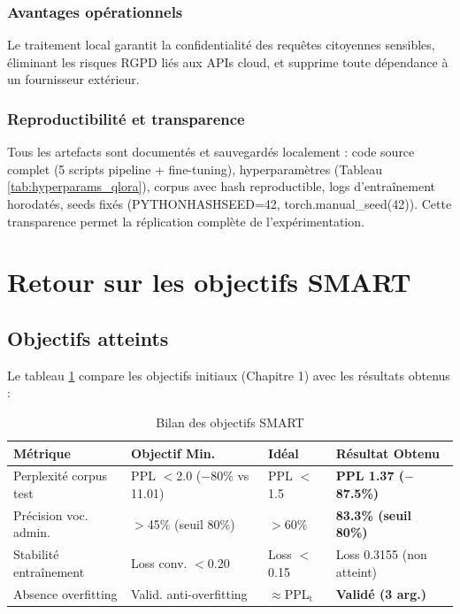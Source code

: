 \subsubsection{Avantages opérationnels}

Le traitement local garantit la confidentialité des requêtes citoyennes sensibles, éliminant les risques RGPD liés aux APIs cloud, et supprime toute dépendance à un fournisseur extérieur.

\subsubsection{Reproductibilité et transparence}

Tous les artefacts sont documentés et sauvegardés localement : code source complet (5 scripts pipeline + fine-tuning), hyperparamètres (Tableau \ref{tab:hyperparams_qlora}), corpus avec hash reproductible, logs d'entraînement horodatés, seeds fixés (PYTHONHASHSEED=42, torch.manual\_seed(42)). Cette transparence permet la réplication complète de l'expérimentation.

\section{Retour sur les objectifs SMART}

\subsection{Objectifs atteints}

Le tableau \ref{tab:smart_final} compare les objectifs initiaux (Chapitre 1) avec les résultats obtenus :

\begin{table}[h]
\centering
\small
\caption{Bilan des objectifs SMART}
\label{tab:smart_final}
\begin{tabular}{@{}p{3cm}p{3cm}p{1.8cm}p{3.2cm}@{}}
\toprule
\textbf{Métrique} & \textbf{Objectif Min.} & \textbf{Idéal} & \textbf{Résultat Obtenu} \\ \midrule
Perplexité corpus test & PPL $<$2.0 ($-$80\% vs 11.01) & PPL $<$1.5 & \textbf{PPL 1.37 ($-$87.5\%)} \\
Précision voc. admin. & $>$45\% (seuil 80\%) & $>$60\% & \textbf{83.3\% (seuil 80\%)} \\
Stabilité entraînement & Loss conv. $<$0.20 & Loss $<$0.15 & Loss 0.3155 (non atteint\footnotemark) \\
Absence overfitting & Valid. anti-overfitting & $\approx$PPL$_{\text{t}}$ & \textbf{Validé (3 arg.)} \\
\bottomrule
\end{tabular}
\end{table}


